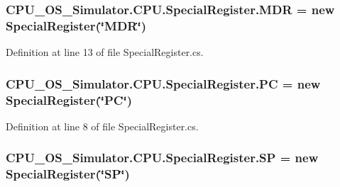 \subsubsection[{M\+D\+R}]{ C\+P\+U\+\_\+\+O\+S\+\_\+\+Simulator.\+C\+P\+U.\+Special\+Register.\+M\+D\+R = new {\bf Special\+Register}(\char`\"{}M\+D\+R\char`\"{})\hspace{0.3cm}{\ttfamily [static]}}\label{class_c_p_u___o_s___simulator_1_1_c_p_u_1_1_special_register_aabf7c761e1f8a9994b7c0b131c53924d}


Definition at line 13 of file Special\+Register.\+cs.

\hypertarget{class_c_p_u___o_s___simulator_1_1_c_p_u_1_1_special_register_afc3205003157a5f135752e6a4f8ffb8a}{}
\subsubsection[{P\+C}]{ C\+P\+U\+\_\+\+O\+S\+\_\+\+Simulator.\+C\+P\+U.\+Special\+Register.\+P\+C = new {\bf Special\+Register}(\char`\"{}P\+C\char`\"{})\hspace{0.3cm}{\ttfamily [static]}}\label{class_c_p_u___o_s___simulator_1_1_c_p_u_1_1_special_register_afc3205003157a5f135752e6a4f8ffb8a}


Definition at line 8 of file Special\+Register.\+cs.

\hypertarget{class_c_p_u___o_s___simulator_1_1_c_p_u_1_1_special_register_ae1699c7972763e73e3f1cfe467cc82e9}{}
\subsubsection[{S\+P}]{ C\+P\+U\+\_\+\+O\+S\+\_\+\+Simulator.\+C\+P\+U.\+Special\+Register.\+S\+P = new {\bf Special\+Register}(\char`\"{}S\+P\char`\"{})\hspace{0.3cm}{\ttfamily [static]}}\label{class_c_p_u___o_s___simulator_1_1_c_p_u_1_1_special_register_ae1699c7972763e73e3f1cfe467cc82e9}


